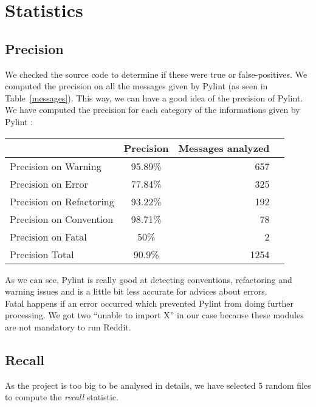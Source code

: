 \documentclass[11pt, a4paper]{article}
\newcommand{\tit}[1]{\textit{#1}}
\newcommand{\pyl}{\textsf{Pylint}}
\begin{document}
\section{Statistics}

\subsection*{Precision}


We checked the source code to determine if these were true or false-positives. We computed the precision on all the messages given by \pyl{} (as seen in Table~\ref{messages}). This way, we can have a good idea of the precision of \pyl{}.\\

We have computed the precision for each category of the informations given by \pyl{} :

\begin{longtable}{|l|c|r|m{9.2cm}|}
\hline
\textbf{\small{}} & \textbf{\small{Precision}} & \textbf{\small{Messages analyzed}} \\
\hline
\hline
Precision on Warning & 95.89\% & 657 \\
Precision on Error & 77.84\% & 325 \\
Precision on Refactoring & 93.22\% & 192 \\
Precision on Convention & 98.71\% & 78 \\
Precision on Fatal & 50\% & 2 \\
\hline
Precision Total & 90.9\% & 1254 \\
\hline
\end{longtable}

As we can see, \pyl{} is really good at detecting conventions, refactoring and warning issues and is a little bit less accurate for advices about errors. \\

Fatal happens if an error occurred which prevented \pyl{} from doing further processing. We got two \enquote{unable to import X} in our case because these modules are not mandatory to run Reddit.

\subsection*{Recall}

As the project is too big to be analysed in details, we have selected 5 random files to compute the \tit{recall} statistic. \\
\end{document}
